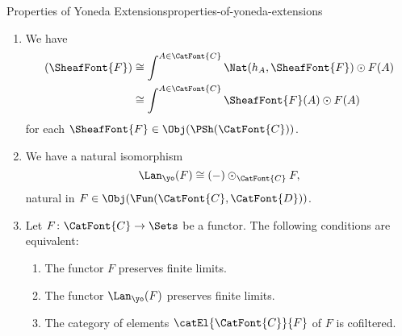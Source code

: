 \begin{proposition}{Properties of Yoneda Extensions}{properties-of-yoneda-extensions}
\begin{enumerate}
\begin{webcompile}
            \end{webcompile}
        \item\label{properties-of-yoneda-extensions-as-a-coend}We have
            \begin{align*}
                [\Lan_{\yo}(F)](\SheafFont{F}) &\cong \int^{A\in\CatFont{C}}\Nat(h_{A},\SheafFont{F})\odot F(A)\\
                                               &\cong \int^{A\in\CatFont{C}}\SheafFont{F}(A)\odot F(A)
            \end{align*}
            for each $\SheafFont{F}\in\Obj(\PSh(\CatFont{C}))$.
        \item\label{properties-of-yoneda-extensions-interaction-with-tensors-of-presheaves-with-functors}We have a natural isomorphism
            \[
                \Lan_{\yo}(F)%
                \cong
                (-)\odot_{\CatFont{C}}F,%
            \]%
            natural in $F\in\Obj(\Fun(\CatFont{C},\CatFont{D}))$.
        \item\label{properties-of-the-yoneda-extensions-interaction-with-finite-limits}Let $F\colon\CatFont{C}\to\Sets$ be a functor. The following conditions are equivalent:
            \begin{enumerate}
                \item\label{properties-of-the-restricted-yoneda-embedding-interaction-with-finite-limits-1}The functor $F$ preserves finite limits.
                \item\label{properties-of-the-restricted-yoneda-embedding-interaction-with-finite-limits-2}The functor $\Lan_{\yo}(F)$ preserves finite limits.
                \item\label{properties-of-the-restricted-yoneda-embedding-interaction-with-finite-limits-3}The category of elements $\catEl{\CatFont{C}}{F}$ of $F$ is cofiltered.
            \end{enumerate}
    \end{enumerate}
\end{proposition}
